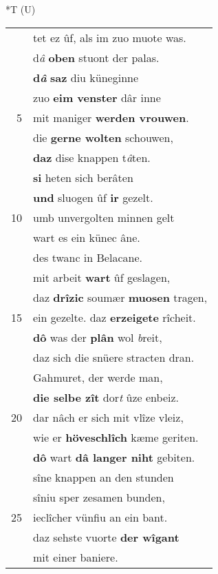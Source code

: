 \documentclass[8pt,a4paper,notitlepage]{article}
\begin{document}
\begin{table}[ht]
\begin{minipage}[t]{0.5\linewidth}
\end{minipage}
\hspace{0.5cm}
\begin{minipage}[t]{0.5\linewidth}
\small
\begin{center}*T (U)
\end{center}
\begin{tabular}{rl}
 & tet ez ûf, als im zuo muote was.\\ 
 & d\textit{â} \textbf{oben} stuont der palas.\\ 
 & \textbf{d\textit{â}} \textbf{saz} diu küneginne\\ 
 & zuo \textbf{eim venster} dâr inne\\ 
5 & mit maniger \textbf{werden vrouwen}.\\ 
 & die \textbf{gerne wolten} schouwen,\\ 
 & \textbf{daz} dise knappen t\textit{â}ten.\\ 
 & \textbf{si} heten sich berâten\\ 
 & \textbf{und} sluogen ûf \textbf{ir} gezelt.\\ 
10 & umb unvergolten minnen gelt\\ 
 & wart es ein künec âne.\\ 
 & des twanc in Belacane.\\ 
 & mit arbeit \textbf{wart} ûf geslagen,\\ 
 & daz \textbf{drîzic} soumær \textbf{muosen} tragen,\\ 
15 & ein gezelte. daz \textbf{erzeigete} rîcheit.\\ 
 & \textbf{dô} was der \textbf{plân} wol \textit{b}reit,\\ 
 & daz sich die snüere stracten dran.\\ 
 & Gahmuret, der werde man,\\ 
 & \textbf{die selbe zît} dor\textit{t} ûze enbeiz.\\ 
20 & dar nâch er sich mit vlîze vleiz,\\ 
 & wie er \textbf{höveschlîch} kæme geriten.\\ 
 & \textbf{dô} wart \textbf{dâ langer niht} gebiten.\\ 
 & sîne knappen an den stunden\\ 
 & sîniu sper zesamen bunden,\\ 
25 & ieclîcher vünfiu an ein bant.\\ 
 & daz sehste vuorte \textbf{der wîgant}\\ 
 & mit einer baniere.\\ 

\end{tabular}
\end{minipage}
\end{table}
\end{document}
